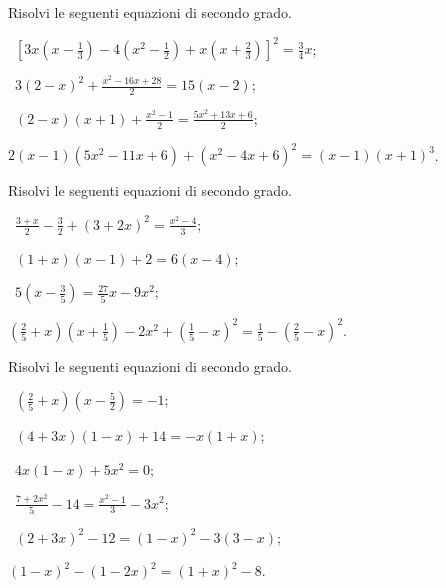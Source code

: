 \begin{esercizio}[\Ast]
\label{ese:3.30} %
Risolvi le seguenti equazioni di secondo grado.
 \begin{enumeratea}
 \item~$\left[3x\left(x-\frac{1}{3}\right)-4\left(x^{2}-\frac{1}{2}\right)+x\left(x+\frac{2}{3}\right)\right]^{2} = \frac{3}{4}x$;
 \item~$3(2-x)^{2}+ \frac{x^{2}-16x+28}{2}= 15(x-2)$;
 \item~$(2-x)(x+1)+\frac{x^{2}-1}{2}=\frac{5x^{2}+13x+6}{2}$;
 \item $2(x-1)\left(5x^{2}-11x+6\right)+\left(x^{2}-4x+6\right)^{2}=(x-1)(x+1)^{3}$.
 \end{enumeratea}
\end{esercizio}

\begin{esercizio}[\Ast]
\label{ese:3.31} %
Risolvi le seguenti equazioni di secondo grado.
 \begin{enumeratea}
 \item~$\frac{3+x}{2}-\frac{3}{2}+(3+2x)^{2} = \frac{x^{2}-4}{3}$;
 \item~$(1+x)(x-1)+2=6(x-4)$;
 \item~$5\left(x-\frac{3}{5}\right)=\frac{27}{5}x-9x^{2}$;
 \item $\left(\frac{2}{5}+x\right)\left(x+\frac{1}{5}\right)-2x^{2}+\left(\frac{1}{5}-x\right)^{2}=\frac{1}{5}-\left(\frac{2}{5}-x\right)^{2}$.
 \end{enumeratea}
\end{esercizio}
\pagebreak
\begin{esercizio}[\Ast]
\label{ese:3.32} %
Risolvi le seguenti equazioni di secondo grado.
\begin{multicols}{2}
 \begin{enumeratea}
 \item~$\left(\frac{2}{5}+x\right)\left(x-\frac{5}{2}\right)=-1$;
 \item~$(4+3x)(1-x)+14=-x(1+x)$;
 \item~$4x(1-x)+5x^{2}=0$;
 \item~$\frac{7+2x^{2}}{5}-14=\frac{x^{2}-1}{3}-3x^{2}$;
 \item~$(2+3x)^{2}-12=(1-x)^{2}-3(3-x)$;
 \item $(1-x)^{2}-(1-2x)^{2}=(1+x)^{2}-8$.
 \end{enumeratea}
\end{multicols}
\end{esercizio}

